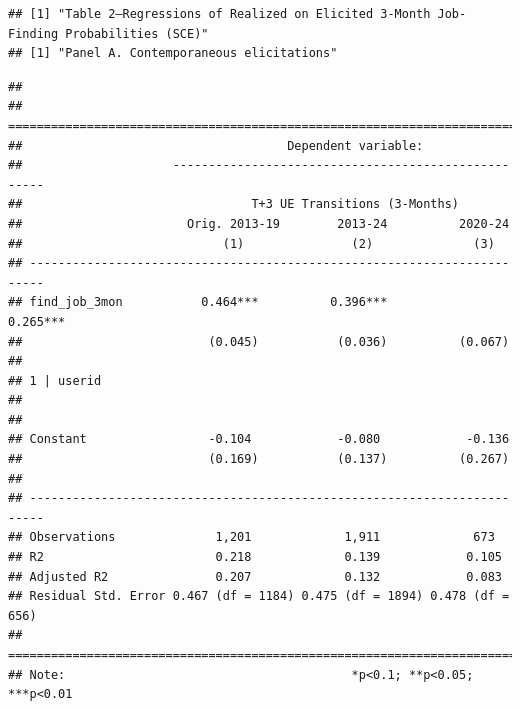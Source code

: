 \documentclass[
]{article}
\begin{document}
\begin{verbatim}
## [1] "Table 2—Regressions of Realized on Elicited 3-Month Job-Finding Probabilities (SCE)"
## [1] "Panel A. Contemporaneous elicitations"
\end{verbatim}

\begin{verbatim}
## 
## ========================================================================
##                                     Dependent variable:                 
##                     ----------------------------------------------------
##                                T+3 UE Transitions (3-Months)            
##                       Orig. 2013-19        2013-24          2020-24     
##                            (1)               (2)              (3)       
## ------------------------------------------------------------------------
## find_job_3mon           0.464***          0.396***          0.265***    
##                          (0.045)           (0.036)          (0.067)     
##                                                                         
## 1 | userid                                                              
##                                                                         
##                                                                         
## Constant                 -0.104            -0.080            -0.136     
##                          (0.169)           (0.137)          (0.267)     
##                                                                         
## ------------------------------------------------------------------------
## Observations              1,201             1,911             673       
## R2                        0.218             0.139            0.105      
## Adjusted R2               0.207             0.132            0.083      
## Residual Std. Error 0.467 (df = 1184) 0.475 (df = 1894) 0.478 (df = 656)
## ========================================================================
## Note:                                        *p<0.1; **p<0.05; ***p<0.01
\end{verbatim}
\end{document}

